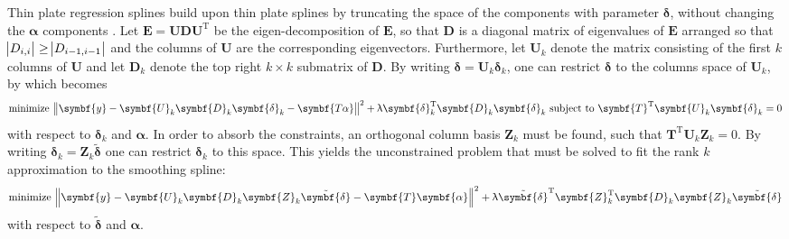 Thin plate regression splines build upon thin plate splines by truncating the space of the components with parameter \(\symbf{\delta}\), without changing the \(\symbf{\alpha}\) components \parencite{Wood2006}.  Let \(\symbf{E} = \symbf{U D U}^{\text{T}}\) be the eigen-decomposition of \(\symbf{E}\), so that \(\symbf{D}\) is a diagonal matrix of eigenvalues of \(\symbf{E}\) arranged so that \(\abs{D_{i, i}} \geq \abs{D_{i - 1, i - 1}}\) and the columns of \(\symbf{U}\) are the corresponding eigenvectors. Furthermore, let \(\symbf{U}_k\) denote the matrix consisting of the first \(k\) columns of \(\symbf{U}\) and let \(\symbf{D}_k\) denote the top right \(k \times k\) submatrix of \(\symbf{D}\).  By writing \(\symbf{\delta} = \symbf{U}_k \symbf{\delta}_k\), one can restrict \(\symbf{\delta}\) to the columns space of \(\symbf{U}_k\), by which  becomes
\begin{equation}
  \label{eq:ThinPlateRegressionSplinesSimplifiedFittingProblem}
  \text{minimize } \norm{\symbf{y} - \symbf{U}_k\symbf{D}_k\symbf{\delta}_k - \symbf{T \alpha}}^2 + \uplambda \symbf{\delta}_k^{\text{T}} \symbf{D}_k \symbf{\delta}_k \text{ subject to } \symbf{T}^{\text{T}} \symbf{U}_k \symbf{\delta}_k = 0
\end{equation}
with respect to \(\symbf{\delta}_k\) and \(\symbf{\alpha}\).  In order to absorb the constraints, an orthogonal column basis \(\symbf{Z}_k\) must be found, such that \(\symbf{T}^{\text{T}} \symbf{U}_k \symbf{Z}_k = 0\).  By writing \(\symbf{\delta}_k = \symbf{Z}_k \tilde{\symbf{\delta}}\) one can restrict \(\symbf{\delta}_k\) to this space.  This yields the unconstrained problem that must be solved to fit the rank \(k\) approximation to the smoothing spline:
\begin{equation}
  \label{eq:ThinPlateRegressionSplinesUnconstrainedFittingProblem}
  \text{minimize } \norm{\symbf{y} - \symbf{U}_k \symbf{D}_k \symbf{Z}_k \tilde{\symbf{\delta}} - \symbf{T} \symbf{\alpha}}^2 + \uplambda \tilde{\symbf{\delta}}^{\text{T}} \symbf{Z}_k^{\text{T}} \symbf{D}_k \symbf{Z}_k \tilde{\symbf{\delta}}
\end{equation}
with respect to \(\tilde{\symbf{\delta}}\) and \(\symbf{\alpha}\).

